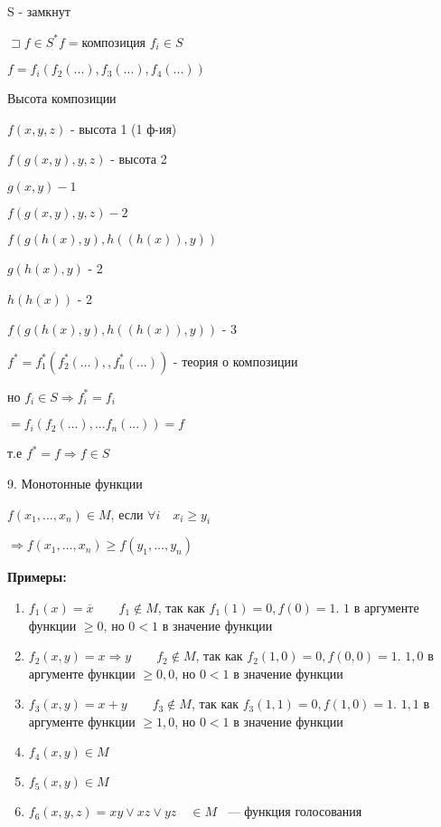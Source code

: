 \documentclass[russian]{lecture-notes}
\begin{document}
    \begin{proposition}

        S - замкнут

        $\sqsupset f \in S^{*} f = $композиция $f_{i} \in S$

        $f = f_{i}(f_{2}(...),f_{3}(...),f_{4}(...))$

    \end{proposition}

    \begin{definition}

        Высота композиции

        $f(x,y,z)$ - высота 1 (1 ф-ия)

        $f(g(x,y),y,z)$ - высота 2

        $g(x,y) - 1$

        $f(g(x,y),y,z) - 2$
    \end{definition}


    \begin{example}
        $f(g(h(x),y),h((h(x)),y))$

        $g(h(x),y)$ - 2

        $h(h(x))$ - 2

        $f(g(h(x),y),h((h(x)),y))$ - 3

    \end{example}

    $f^{*} = f_{1}^{*}(f_{2}^{*}(...),  ,f_{n}^{*}(...))$ - теория о композиции

    но $f_{i} \in S \Rightarrow f_{i}^{*} = f_{i}$

    $= f_{i}(f_{2}(...),...f_{n}(...)) = f$

    т.е $f^{*} = f \Rightarrow f \in S$

    9. Монотонные функции

    $f(x_1, \dots, x_n) \in M$, если $\forall i \quad x_i \geq y_i$

    $\Rightarrow f(x_1, \dots, x_n) \geq f(y_1, \dots, y_n)$

    \textbf{Примеры:}
    \begin{enumerate}
        \item{
            $f_1(x) = \overline{x} \qquad f_1 \notin M$, так как $f_1(1) = 0, f(0) = 1$.
            $1$ в аргументе функции $\geq 0$, но $0 < 1$ в значение функции

        }
        \item{
            $f_2(x, y) = x \Rightarrow y \qquad f_2 \notin M$, так как $f_2(1,0) = 0, f(0,0) = 1$.
            $1,0$ в аргументе функции $\geq 0,0$, но $0 < 1$ в значение функции
        }
        \item{
            $f_3(x, y) = x + y \qquad f_3 \notin M$, так как $f_3(1,1) = 0, f(1,0) = 1$.
            $1,1$ в аргументе функции $\geq 1,0$, но $0 < 1$ в значение функции
        }
        \item $f_4(x, y) \in M$
        \item $f_5(x, y) \in M$
        \item $f_6(x, y, z) = xy \lor xz \lor yz \quad \in M$ ~--- функция голосования
    \end{enumerate}
\end{document}
